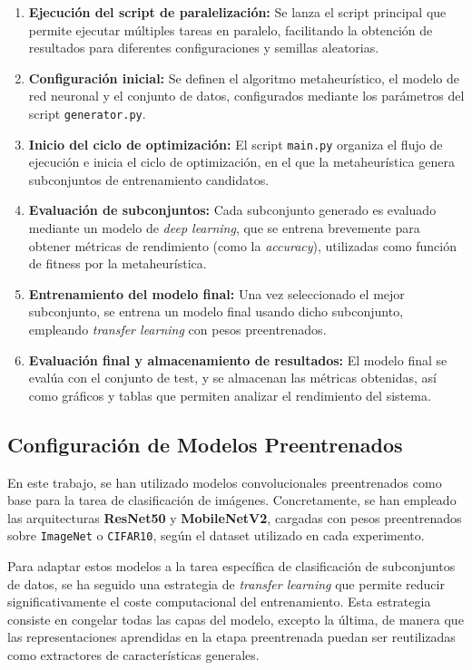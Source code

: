\begin{enumerate}
      \item \textbf{Ejecución del script de paralelización:} Se lanza el script principal que permite ejecutar múltiples tareas en paralelo,
            facilitando la obtención de resultados para diferentes configuraciones y semillas aleatorias.
      \item \textbf{Configuración inicial:} Se definen el algoritmo metaheurístico, el modelo de red neuronal y el conjunto de datos,
            configurados mediante los parámetros del script \texttt{generator.py}.
      \item \textbf{Inicio del ciclo de optimización:} El script \texttt{main.py} organiza el flujo de ejecución e inicia el ciclo de optimización,
            en el que la metaheurística genera subconjuntos de entrenamiento candidatos.
      \item \textbf{Evaluación de subconjuntos:} Cada subconjunto generado es evaluado mediante un modelo de \textit{deep learning},
            que se entrena brevemente para obtener métricas de rendimiento (como la \textit{accuracy}),
            utilizadas como función de fitness por la metaheurística.
      \item \textbf{Entrenamiento del modelo final:} Una vez seleccionado el mejor subconjunto, se entrena un modelo final
            usando dicho subconjunto, empleando \textit{transfer learning} con pesos preentrenados.
      \item \textbf{Evaluación final y almacenamiento de resultados:} El modelo final se evalúa con el conjunto de test,
            y se almacenan las métricas obtenidas, así como gráficos y tablas que permiten analizar el rendimiento del sistema.
\end{enumerate}

\subsection{Configuración de Modelos Preentrenados}\label{subsec:configuracion-modelos-preentrenados}
En este trabajo, se han utilizado modelos convolucionales preentrenados como base para la tarea de clasificación de imágenes.
Concretamente, se han empleado las arquitecturas \textbf{ResNet50} y \textbf{MobileNetV2},
cargadas con pesos preentrenados sobre \texttt{ImageNet} o \texttt{CIFAR10}, según el dataset utilizado en cada experimento.

Para adaptar estos modelos a la tarea específica de clasificación de subconjuntos de datos,
se ha seguido una estrategia de \textit{transfer learning} que permite reducir significativamente el coste computacional del entrenamiento.
Esta estrategia consiste en congelar todas las capas del modelo, excepto la última,
de manera que las representaciones aprendidas en la etapa preentrenada puedan ser reutilizadas como extractores de características generales.

